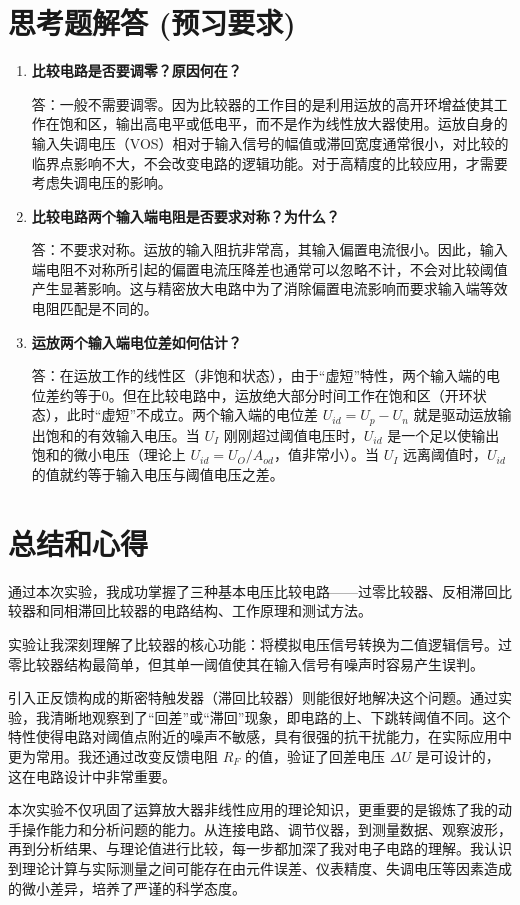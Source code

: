 \documentclass[a4paper]{ctexart}
\begin{document}
\section{思考题解答 (预习要求)}
\begin{enumerate}
    \item \textbf{比较电路是否要调零？原因何在？}
    
    答：一般不需要调零。因为比较器的工作目的是利用运放的高开环增益使其工作在饱和区，输出高电平或低电平，而不是作为线性放大器使用。运放自身的输入失调电压（VOS）相对于输入信号的幅值或滞回宽度通常很小，对比较的临界点影响不大，不会改变电路的逻辑功能。对于高精度的比较应用，才需要考虑失调电压的影响。

    \item \textbf{比较电路两个输入端电阻是否要求对称？为什么？}
    
    答：不要求对称。运放的输入阻抗非常高，其输入偏置电流很小。因此，输入端电阻不对称所引起的偏置电流压降差也通常可以忽略不计，不会对比较阈值产生显著影响。这与精密放大电路中为了消除偏置电流影响而要求输入端等效电阻匹配是不同的。

    \item \textbf{运放两个输入端电位差如何估计？}
    
    答：在运放工作的线性区（非饱和状态），由于“虚短”特性，两个输入端的电位差约等于0。但在比较电路中，运放绝大部分时间工作在饱和区（开环状态），此时“虚短”不成立。两个输入端的电位差 $U_{id} = U_p - U_n$ 就是驱动运放输出饱和的有效输入电压。当 $U_I$ 刚刚超过阈值电压时，$U_{id}$ 是一个足以使输出饱和的微小电压（理论上 $U_{id} = U_O/A_{od}$，值非常小）。当 $U_I$ 远离阈值时，$U_{id}$ 的值就约等于输入电压与阈值电压之差。
\end{enumerate}

\section{总结和心得}
通过本次实验，我成功掌握了三种基本电压比较电路——过零比较器、反相滞回比较器和同相滞回比较器的电路结构、工作原理和测试方法。

实验让我深刻理解了比较器的核心功能：将模拟电压信号转换为二值逻辑信号。过零比较器结构最简单，但其单一阈值使其在输入信号有噪声时容易产生误判。

引入正反馈构成的斯密特触发器（滞回比较器）则能很好地解决这个问题。通过实验，我清晰地观察到了“回差”或“滞回”现象，即电路的上、下跳转阈值不同。这个特性使得电路对阈值点附近的噪声不敏感，具有很强的抗干扰能力，在实际应用中更为常用。我还通过改变反馈电阻 $R_F$ 的值，验证了回差电压 $\Delta U$ 是可设计的，这在电路设计中非常重要。

本次实验不仅巩固了运算放大器非线性应用的理论知识，更重要的是锻炼了我的动手操作能力和分析问题的能力。从连接电路、调节仪器，到测量数据、观察波形，再到分析结果、与理论值进行比较，每一步都加深了我对电子电路的理解。我认识到理论计算与实际测量之间可能存在由元件误差、仪表精度、失调电压等因素造成的微小差异，培养了严谨的科学态度。
\end{document}
